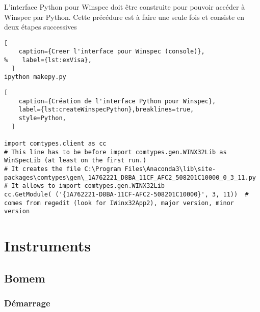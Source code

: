 \documentclass[11pt,francais]{book} %
\begin{document}
L'interface Python pour Winspec doit être construite pour pouvoir accéder à Winspec par Python.
Cette précédure est à faire une seule fois et consiste en deux étapes successives

\begin{lstlisting}[
    caption={Creer l'interface pour Winspec (console)},
%    label={lst:exVisa},
  ]
ipython makepy.py 
\end{lstlisting}
                

\begin{lstlisting}[
    caption={Création de l'interface Python pour Winspec},
    label={lst:createWinspecPython},breaklines=true,
    style=Python,
  ]
  
import comtypes.client as cc
# This line has to be before import comtypes.gen.WINX32Lib as WinSpecLib (at least on the first run.)
# It creates the file C:\Program Files\Anaconda3\lib\site-packages\comtypes\gen\_1A762221_D8BA_11CF_AFC2_508201C10000_0_3_11.py
# It allows to import comtypes.gen.WINX32Lib
cc.GetModule( ('{1A762221-D8BA-11CF-AFC2-508201C10000}', 3, 11))  # comes from regedit (look for IWinx32App2), major version, minor version
\end{lstlisting}
                

\chapter{Instruments}


\section{Bomem}

\subsection{Démarrage}
\end{document}
